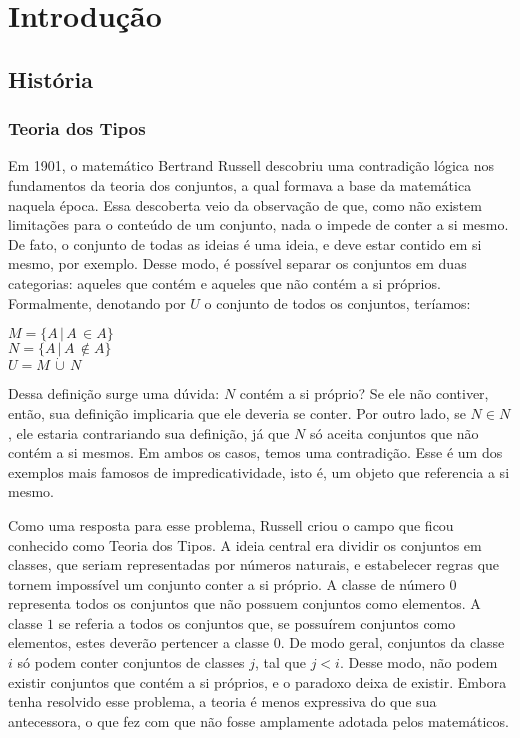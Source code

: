 \documentclass[12pt, oneside, a4paper,english,brazil]{abntex2}
\begin{document}
\imprimircapa
\imprimirfolhaderosto

\tableofcontents* %

\textual

\chapter{Introdução}
\section{Hist\'oria}

\subsection*{Teoria dos Tipos}

\qquad Em 1901, o matemático Bertrand Russell descobriu uma contradição lógica nos
fundamentos da teoria dos conjuntos, a qual formava a base da matemática naquela época.
Essa descoberta veio da observação de que, como não existem limitações para o conteúdo
de um conjunto, nada o impede de conter a si mesmo. De fato, o conjunto de todas as
ideias é uma ideia, e deve estar contido em si mesmo, por exemplo. Desse modo, é possível
separar os conjuntos em duas categorias: aqueles que contém e aqueles que não contém a
si próprios. Formalmente, denotando por $U$ o conjunto de todos os conjuntos, teríamos:

\begin{center}
  $M = \{A\, |\, A\, \in A\}$ \\
  $N = \{A\, |\, A\, \notin A\}$ \\
  $U = M\, \dot\cup\, N$
\end{center}

\qquad Dessa definição surge uma dúvida: $N$ contém a si próprio? Se ele não contiver,
então, sua definição implicaria que ele deveria se conter. Por outro lado, se $N \in N$ , ele
estaria contrariando sua definição, já que $N$ só aceita conjuntos que não contém a si
mesmos. Em ambos os casos, temos uma contradição. Esse é um dos exemplos mais
famosos de impredicatividade, isto é, um objeto que referencia a si mesmo.

\qquad Como uma resposta para esse problema, Russell criou o campo que ficou conhecido
como Teoria dos Tipos. A ideia central era dividir os conjuntos em classes, que seriam
representadas por números naturais, e estabelecer regras que tornem impossível um
conjunto conter a si próprio. A classe de número $0$ representa todos os conjuntos que
não possuem conjuntos como elementos. A classe $1$ se referia a todos os conjuntos que,
se possuírem conjuntos como elementos, estes deverão pertencer a classe $0$. De modo
geral, conjuntos da classe $i$ só podem conter conjuntos de classes $j$, tal que $j < i$. Desse
modo, não podem existir conjuntos que contém a si próprios, e o paradoxo deixa de existir.
Embora tenha resolvido esse problema, a teoria é menos expressiva do que sua antecessora,
o que fez com que não fosse amplamente adotada pelos matemáticos.
\end{document}
